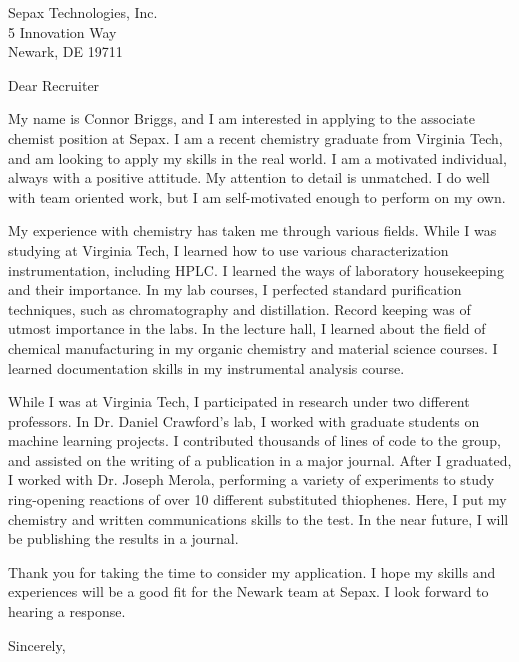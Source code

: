 \documentclass[12pt]{letter}
\begin{document}
\begin{letter}{Sepax Technologies, Inc.\\5 Innovation Way\\Newark, DE 19711}

  \opening{Dear Recruiter}

   My name is Connor Briggs, and I am interested in applying to the associate chemist position at Sepax. I am a recent chemistry graduate from Virginia Tech, and am looking to apply my skills in the real world.  I am a motivated individual, always with a positive attitude. My attention to detail is unmatched. I do well with team oriented work, but I am self-motivated enough to perform on my own.
  
  
   My experience with chemistry has taken me through various fields. While I was studying at Virginia Tech, I learned how to use various characterization instrumentation, including HPLC. I learned the ways of laboratory housekeeping and their importance. In my lab courses, I perfected standard purification techniques, such as chromatography and distillation. Record keeping was of utmost importance in the labs. In the lecture hall, I learned about the field of chemical manufacturing in my organic chemistry and material science courses. I learned documentation skills in my instrumental analysis course.


   While I was at Virginia Tech, I participated in research under two different professors. In Dr. Daniel Crawford's lab, I worked with graduate students on machine learning projects. I contributed thousands of lines of code to the group, and assisted on the writing of a publication in a major journal. After I graduated, I worked with Dr. Joseph Merola, performing a variety of experiments to study ring-opening reactions of over 10 different substituted thiophenes. Here, I put my chemistry and written communications skills to the test. In the near future, I will be publishing the results in a journal.


  Thank you for taking the time to consider my application. I hope my skills and experiences will be a good fit for the Newark team at Sepax. I look forward to hearing a response.
\closing{Sincerely,}
  
\end{letter}
\end{document}
